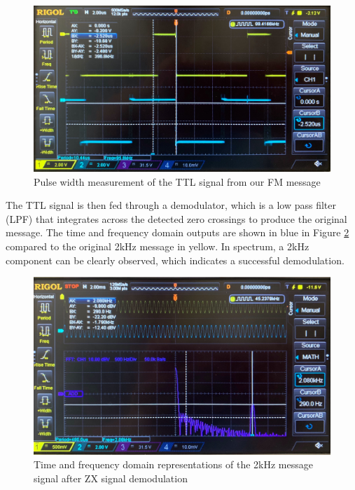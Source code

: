 \documentclass[11pt]{article}
\begin{document}
\begin{enumerate}[label=(\alph*)]
\begin{figure}[H]
    \centering
    \includegraphics[width=15cm]{W3Q5b_.jpg}
    \caption{Pulse width measurement of the TTL signal from our FM message}
    \label{fig:W3Q5b_}
\end{figure}
The TTL signal is then fed through a demodulator, which is a low pass filter (LPF) that integrates across the detected zero crossings to produce the original message. The time and frequency domain outputs are shown in blue in Figure \ref{fig:W3Q5b} compared to the original 2kHz message in yellow. In spectrum, a 2kHz component can be clearly observed, which indicates a successful demodulation. 
\begin{figure}[H]
    \centering
    \includegraphics[width=15cm]{W3Q5b.jpg}
    \caption{Time and frequency domain representations of the 2kHz message signal after ZX signal demodulation}
    \label{fig:W3Q5b}
\end{figure}
\end{enumerate}
\end{document}
